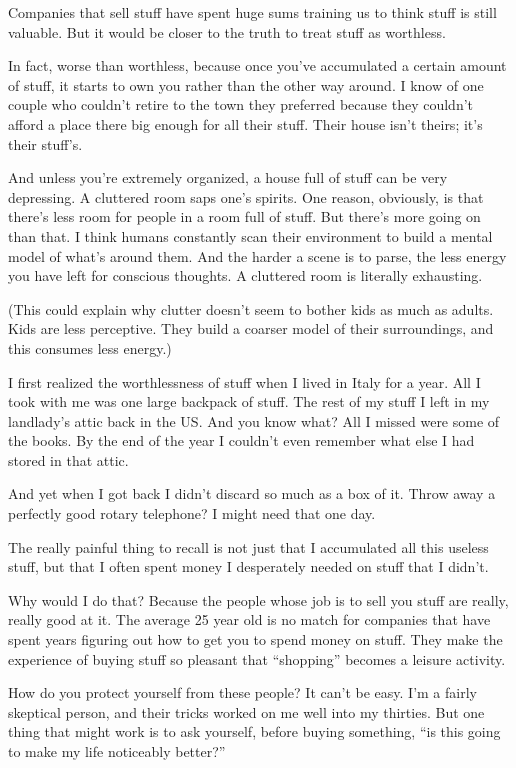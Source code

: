 Companies that sell stuff have spent huge sums training us to think
stuff is still valuable. But it would be closer to the truth to treat
stuff as worthless.

In fact, worse than worthless, because once you've accumulated a certain
amount of stuff, it starts to own you rather than the other way around.
I know of one couple who couldn't retire to the town they preferred
because they couldn't afford a place there big enough for all their
stuff. Their house isn't theirs; it's their stuff's.

And unless you're extremely organized, a house full of stuff can be very
depressing. A cluttered room saps one's spirits. One reason, obviously,
is that there's less room for people in a room full of stuff. But
there's more going on than that. I think humans constantly scan their
environment to build a mental model of what's around them. And the
harder a scene is to parse, the less energy you have left for conscious
thoughts. A cluttered room is literally exhausting.

(This could explain why clutter doesn't seem to bother kids as much as
adults. Kids are less perceptive. They build a coarser model of their
surroundings, and this consumes less energy.)

I first realized the worthlessness of stuff when I lived in Italy for a
year. All I took with me was one large backpack of stuff. The rest of my
stuff I left in my landlady's attic back in the US. And you know what?
All I missed were some of the books. By the end of the year I couldn't
even remember what else I had stored in that attic.

And yet when I got back I didn't discard so much as a box of it. Throw
away a perfectly good rotary telephone? I might need that one day.

The really painful thing to recall is not just that I accumulated all
this useless stuff, but that I often spent money I desperately needed on
stuff that I didn't.

Why would I do that? Because the people whose job is to sell you stuff
are really, really good at it. The average 25 year old is no match for
companies that have spent years figuring out how to get you to spend
money on stuff. They make the experience of buying stuff so pleasant
that ``shopping'' becomes a leisure activity.

How do you protect yourself from these people? It can't be easy. I'm a
fairly skeptical person, and their tricks worked on me well into my
thirties. But one thing that might work is to ask yourself, before
buying something, ``is this going to make my life noticeably better?''

